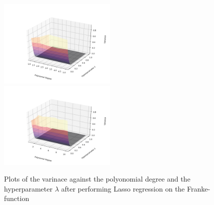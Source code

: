 \documentclass[a4paper,10pt,english]{article}
\begin{document}
%





\begin{figure}[H]
	\centering 
	\includegraphics[width = 0.5\textwidth, center]{../franke_output/part_E_1.png}
	\includegraphics[width = 0.5\textwidth, center]{../franke_output/part_E_1_highdeg.png}
	\caption{
		Plots of the varinace against the polyonomial degree and the hyperparameter $\lambda$ after performing Lasso regression on the Franke-function
	}
	\label{part_e1}
\end{figure}
\end{document}
